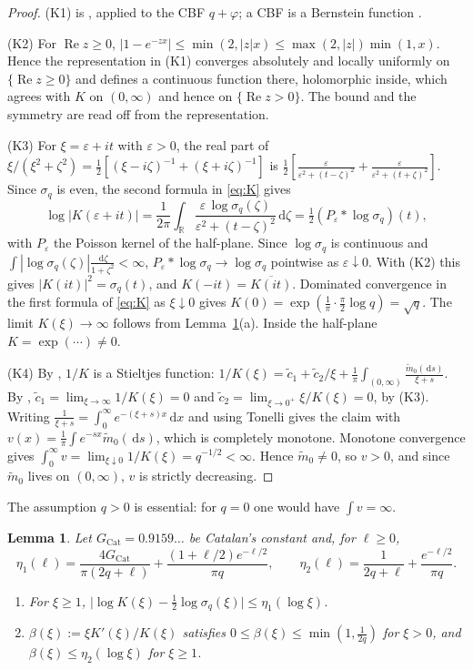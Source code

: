 \documentclass[11pt]{amsart}
\newcommand{\R}{\mathbb{R}}
\newcommand{\eps}{\varepsilon}
\newcommand{\dd}{\,\mathrm{d}}
\DeclareMathOperator{\re}{Re}
\newtheorem{lemma}[theorem]{Lemma}
\theoremstyle{definition}
\theoremstyle{remark}
\numberwithin{equation}{section}
\begin{document}
\begin{proof}
(K1) is \cite[Lemma~3.8]{Kw11}, applied to the CBF $q+\varphi$; a CBF is a Bernstein function \cite[(2.20)]{Kw11}.

(K2) For $\re z\ge0$, $|1-e^{-zx}|\le\min(2,|z|x)\le\max(2,|z|)\min(1,x)$. Hence the representation in (K1) converges absolutely and locally uniformly on $\{\re z\ge0\}$ and defines a continuous function there, holomorphic inside, which agrees with $K$ on $(0,\infty)$ and hence on $\{\re z>0\}$. The bound and the symmetry are read off from the representation.

(K3) For $\xi=\eps+it$ with $\eps>0$, the real part of $\xi/(\xi^2+\zeta^2)=\frac12[(\xi-i\zeta)^{-1}+(\xi+i\zeta)^{-1}]$ is $\frac12[\frac{\eps}{\eps^2+(t-\zeta)^2}+\frac{\eps}{\eps^2+(t+\zeta)^2}]$. Since $\sigma_q$ is even, the second formula in \eqref{eq:K} gives
\[
\log|K(\eps+it)|=\frac1{2\pi}\int_\R\frac{\eps\,\log\sigma_q(\zeta)}{\eps^2+(t-\zeta)^2}\dd\zeta=\tfrac12(P_\eps*\log\sigma_q)(t),
\]
with $P_\eps$ the Poisson kernel of the half-plane. Since $\log\sigma_q$ is continuous and $\int|\log\sigma_q(\zeta)|\frac{\dd\zeta}{1+\zeta^2}<\infty$, $P_\eps*\log\sigma_q\to\log\sigma_q$ pointwise as $\eps\downarrow0$. With (K2) this gives $|K(it)|^2=\sigma_q(t)$, and $K(-it)=\overline{K(it)}$. Dominated convergence in the first formula of \eqref{eq:K} as $\xi\downarrow0$ gives $K(0)=\exp(\frac1\pi\cdot\frac\pi2\log q)=\sqrt q$. The limit $K(\xi)\to\infty$ follows from Lemma~\ref{lem:Kasym}(a). Inside the half-plane $K=\exp(\cdots)\ne0$.

(K4) By \cite[Prop.~2.17(a)]{Kw11}, $1/K$ is a Stieltjes function: $1/K(\xi)=\tilde c_1+\tilde c_2/\xi+\frac1\pi\int_{(0,\infty)}\frac{\tilde m_0(\dd s)}{\xi+s}$. By \cite[Prop.~2.18]{Kw11}, $\tilde c_1=\lim_{\xi\to\infty}1/K(\xi)=0$ and $\tilde c_2=\lim_{\xi\to0^+}\xi/K(\xi)=0$, by (K3). Writing $\frac1{\xi+s}=\int_0^\infty e^{-(\xi+s)x}\dd x$ and using Tonelli gives the claim with $v(x)=\frac1\pi\int e^{-sx}\tilde m_0(\dd s)$, which is completely monotone. Monotone convergence gives $\int_0^\infty v=\lim_{\xi\downarrow0}1/K(\xi)=q^{-1/2}<\infty$. Hence $\tilde m_0\ne0$, so $v>0$, and since $\tilde m_0$ lives on $(0,\infty)$, $v$ is strictly decreasing.
\end{proof}

The assumption $q>0$ is essential: for $q=0$ one would have $\int v=\infty$.

\begin{lemma}\label{lem:Kasym}
Let $G_{\mathrm{Cat}}=0.9159\ldots$ be Catalan's constant and, for $\ell\ge0$,
\[
\eta_1(\ell)=\frac{4G_{\mathrm{Cat}}}{\pi(2q+\ell)}+\frac{(1+\ell/2)e^{-\ell/2}}{\pi q},\qquad \eta_2(\ell)=\frac1{2q+\ell}+\frac{e^{-\ell/2}}{\pi q}.
\]
\begin{enumerate}
\item[(a)] For $\xi\ge1$, $\bigl|\log K(\xi)-\frac12\log\sigma_q(\xi)\bigr|\le\eta_1(\log\xi)$.
\item[(b)] $\beta(\xi):=\xi K'(\xi)/K(\xi)$ satisfies $0\le\beta(\xi)\le\min(1,\frac1{2q})$ for $\xi>0$, and $\beta(\xi)\le\eta_2(\log\xi)$ for $\xi\ge1$.
\end{enumerate}
\end{lemma}
\end{document}
